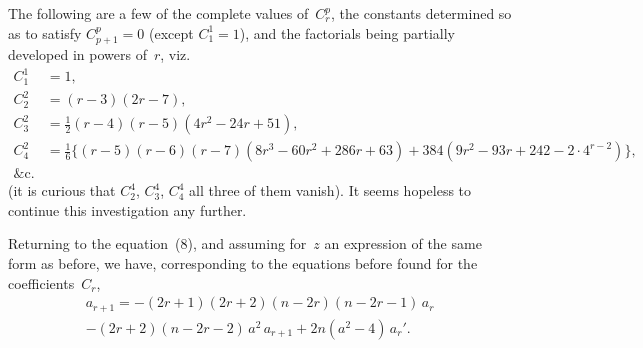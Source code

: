 \documentclass[11pt,a4paper]{article}
\begin{document}
The following are a few of the complete values of~$C_r^p$, the constants determined so as to satisfy $C_{p+1}^p = 0$ (except $C_1^1 = 1$), and the factorials being partially developed in powers of~$r$, viz.
\begin{align*}
C_1^1 &= 1,\\
C_2^2 &= (r-3)(2r-7),\\
C_3^2 &= \tfrac{1}{2}(r-4)(r-5)(4r^2 - 24r + 51),\\
C_4^2 &= \tfrac{1}{6}\{(r-5)(r-6)(r-7)(8r^3 - 60r^2 + 286r + 63) + 384(9r^2 - 93r + 242 - 2 \cdot 4^{r-2})\},\\
\&\text{c.}
\end{align*}
(it is curious that $C_2^4$, $C_3^4$, $C_4^4$ all three of them vanish). It seems hopeless to continue this investigation any further.

Returning to the equation~(8), and assuming for~$z$ an expression of the same form as before, we have, corresponding to the equations before found for the coefficients~$C_r$,
\begin{multline*}
a_{r+1} = -(2r+1)(2r+2)(n-2r)(n-2r-1)\,a_r \\
- (2r+2)(n-2r-2)\,a^2\,a_{r+1} + 2n(a^2-4)\,a_r'.
\end{multline*}
\end{document}

